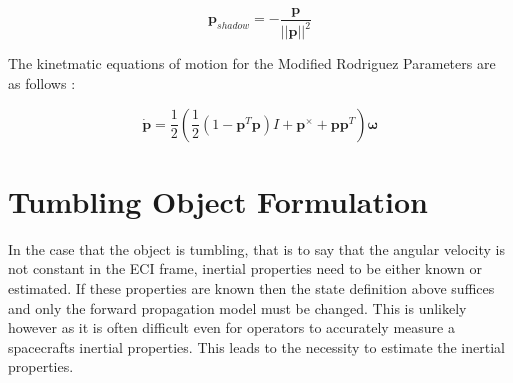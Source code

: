 \begin{equation}
\bm{p}_{shadow} = -\frac{\bm{p}}{||\bm{p}||^2}
\end{equation}

The kinetmatic equations of motion for the Modified Rodriguez Parameters are as follows \cite{Crassidis_MRPs}:

\begin{equation}
	\dot{\bm{p}} = \frac{1}{2} \left ( \frac{1}{2} (1 - \bm{p}^T\bm{p})I + \bm{p}^{\times} + \bm{p}\bm{p}^T \right )\bm{\omega}
\end{equation}

\section{Tumbling Object Formulation}

In the case that the object is tumbling, that is to say that the angular velocity is not constant in the ECI frame, inertial properties need to be either known or estimated. If these properties are known then the state definition above suffices and only the forward propagation model must be changed. This is unlikely however as it is often difficult even for operators to accurately measure a spacecrafts inertial properties. This leads to the necessity to estimate the inertial properties.

